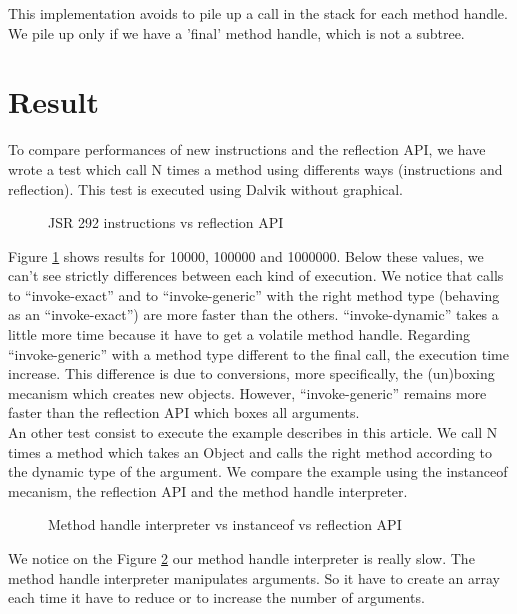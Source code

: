 \documentclass{sig-alternate}
\def \DALVIK{Dalvik\xspace}
\begin{document}
        
    
        This implementation avoids to pile up a call in the stack for each method handle.
        We pile up only if we have a 'final' method handle, which is not a subtree.

\section{Result}

  To compare performances of new instructions and the reflection API,
  we have wrote a test which call N times a method using differents ways (instructions and reflection).
  This test is executed using \DALVIK without graphical.

  \begin{figure}[!h]
    \resizebox{\linewidth}{!}{}
    \caption{JSR 292 instructions vs reflection API}
    \label{Rinvoke}
  \end{figure}

  Figure \ref{Rinvoke} shows results for 10000, 100000 and 1000000.
  Below these values, we can't see strictly differences between each kind of execution.
  We notice that calls to ``invoke-exact'' and to ``invoke-generic'' with the right method type (behaving as an ``invoke-exact'') are more faster than the others.
  ``invoke-dynamic'' takes a little more time because it have to get a volatile method handle.
  Regarding ``invoke-generic'' with a method type different to the final call, the execution time increase.
  This difference is due to conversions, more specifically, the (un)boxing mecanism which creates new objects.
  However, ``invoke-generic'' remains more faster than the reflection API which boxes all arguments.\\
  
  An other test consist to execute the example describes in this article.
  We call N times a method which takes an Object and calls the right method according to the dynamic type of the argument.
  We compare the example using the instanceof mecanism, the reflection API and the method handle interpreter.

  \begin{figure}[!h]
    \resizebox{\linewidth}{!}{}
    \caption{Method handle interpreter vs instanceof vs reflection API}
    \label{Rmutable}
  \end{figure}

  We notice on the Figure \ref{Rmutable} our method handle interpreter is really slow.
  The method handle interpreter manipulates arguments.
  So it have to create an array each time it have to reduce or to increase the number of arguments.
\end{document}
